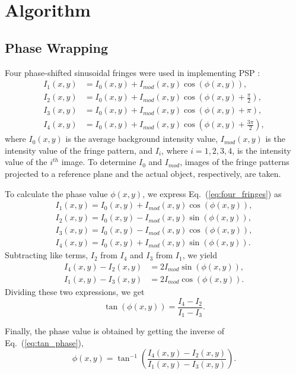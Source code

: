 \section{Algorithm}

\subsection{Phase Wrapping}
Four phase-shifted sinusoidal fringes were used in implementing PSP \cite{Chen2005}: 
\begin{align}
I_1(x,y)&=I_0(x,y) + I_{mod}(x,y)\cos{(\phi(x,y))}, \nonumber\\
I_2(x,y)&=I_0(x,y) + I_{mod}(x,y)\cos{(\phi(x,y)+\frac{\pi}{2})}, \nonumber\\
I_3(x,y)&=I_0(x,y) + I_{mod}(x,y)\cos{(\phi(x,y)+\pi)},\nonumber\\
I_4(x,y)&=I_0(x,y) + I_{mod}(x,y)\cos{(\phi(x,y)+\frac{3\pi}{2})},
\label{eq:four_fringes}
\end{align}  
where $I_0(x,y)$ is the average background intensity value, $I_{mod}(x,y)$ is the intensity value of the fringe pattern, and $I_i$, where $i=1,2,3,4$, is the intensity value of the $i^{th}$ image. To determine $I_0$ and $I_{mod}$, images of the fringe patterns projected to a reference plane and the actual object, respectively, are taken. 

To calculate the phase value $\phi(x,y)$, we express Eq.~(\ref{eq:four_fringes}) as 
\begin{align}
I_1(x,y)=I_0(x,y) + I_{mod}(x,y)\cos{(\phi(x,y))}, \nonumber\\
I_2(x,y)=I_0(x,y) - I_{mod}(x,y)\sin{(\phi(x,y))}, \nonumber\\
I_3(x,y)=I_0(x,y) - I_{mod}(x,y)\cos{(\phi(x,y))},\nonumber\\
I_4(x,y)=I_0(x,y) + I_{mod}(x,y)\sin{(\phi(x,y))}.
\label{eq:four_fringes2}
\end{align}  
Subtracting like terms, $I_2$ from $I_4$ and $I_3$ from $I_1$, we yield
\begin{align}
I_4(x,y)-I_2(x,y)&=2I_{mod}\sin{(\phi(x,y))}, \nonumber\\
I_1(x,y)-I_3(x,y)&=2I_{mod}\cos{(\phi(x,y))}.
\end{align}  
Dividing these two expressions, we get
\begin{equation}
\tan(\phi(x,y))=\frac{I_4-I_2}{I_1-I_3}.
\label{eq:tan_phase}
\end{equation}

Finally, the phase value is obtained by getting the inverse of Eq.~(\ref{eq:tan_phase}),
\begin{equation}
\phi(x,y)=\tan^{-1}{\left( \frac{I_4(x,y) - I_2(x,y)}{I_1(x,y)- I_3(x,y)}\right)}.
\label{eq:phase}
\end{equation}

